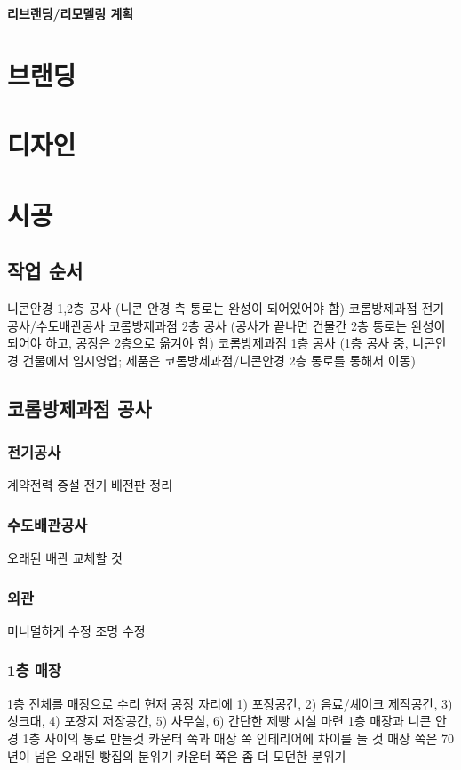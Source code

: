 \documentclass{myproc}
\begin{document}
\begin{center}
  \textcolor{blue2}{\large\bf 리브랜딩/리모델링 계획}
  \\
  \vspace*{0.8cm}

\end{center}

\small

\section{브랜딩}

\section{디자인}

\section{시공}
\subsection{작업 순서}
\ben
\w 니콘안경 1,2층 공사 (니콘 안경 측 통로는 완성이 되어있어야 함)
\w 코롬방제과점 전기공사/수도배관공사
\w 코롬방제과점 2층 공사 (공사가 끝나면 건물간 2층 통로는 완성이 되어야 하고,
공장은 2층으로 옮겨야 함)
\w 코롬방제과점 1층 공사 (1층 공사 중, 니콘안경 건물에서 임시영업; 제품은
코롬방제과점/니콘안경 2층 통로를 통해서 이동)
\een

\subsection{코롬방제과점 공사}
\subsubsection{전기공사}
\bit
\w 계약전력 증설
\w 전기 배전판 정리
\eit
\subsubsection{수도배관공사}
\bit
\w 오래된 배관 교체할 것
\eit
\subsubsection{외관}
\bit
\w 미니멀하게 수정
\w 조명 수정
\eit
\subsubsection{1층 매장}
\bit
\w 1층 전체를  매장으로 수리
\w 현재 공장 자리에 1) 포장공간, 2) 음료/셰이크 제작공간, 3) 싱크대, 4) 포장지
저장공간, 5) 사무실, 6) 간단한 제빵 시설 마련
\w 1층 매장과 니콘 안경 1층 사이의  통로 만들것
\w 카운터 쪽과 매장 쪽 인테리어에 차이를 둘 것
\w 매장 쪽은 70년이 넘은 오래된 빵집의 분위기
\w 카운터 쪽은 좀 더 모던한 분위기
\eit
\end{document}
